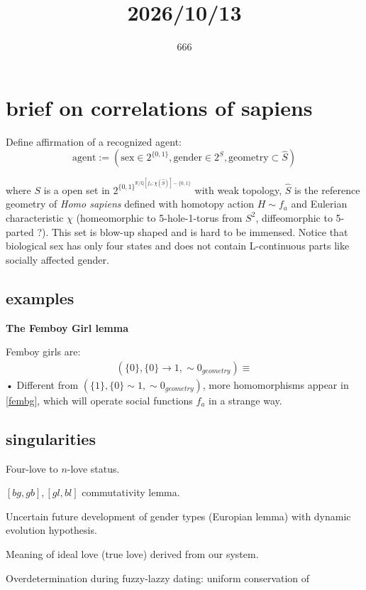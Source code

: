 \documentclass[a4paper]{article}
\title{2026/10/13}
\author{666}
\date{}
\newcommand{\Q}{\mathbb{Q}}
\newcommand{\R}{\mathbb{R}}
\begin{document}
\maketitle
\section{brief on correlations of sapiens}

Define affirmation of a recognized agent:
\[ 
\mathrm{agent} := \left( \text{sex}\in 2^{\{0,1\}}, \text{gender}\in 2^{\mathit{S}}, \text{geometry}\subset \hat{S} \right)
\]

where $\mathit{S} $ is a open set in $2^{{\{0,1\}}^ {\R/ \Q[f_{a}; \chi(\hat{S}) ] - \{0,1\}}}$ with weak topology, $\hat{S}$ is the reference geometry of \textit{Homo sapiens} defined with homotopy action $H \sim f_a $ and Eulerian characteristic $\chi$ (homeomorphic to 5-hole-1-torus from $S^2$,  diffeomorphic to 5-parted ?). This set is blow-up shaped and is hard to be immensed. Notice that biological sex has only four states and does not contain L-continuous parts like socially affected gender.

\subsection{examples}
\noindent \textbf{The Femboy Girl lemma}

Femboy girls are: 
\begin{align}\label{fembg}
\left(  \{0\}, \{0\}\rightarrow {1}, \sim{0}_{geometry } \right) \equiv  
\end{align}•
Different from $(\{1\}, \{0\}\sim{1} , \sim{0}_{geometry} )$, more homomorphisms appear in \ref{fembg}, which will operate social functions $f_a$ in a strange way.


\subsection{singularities}

Four-love to $n$-love status.

$[bg, gb], [gl, bl]$ commutativity lemma.

Uncertain future development of gender types (Europian lemma) with dynamic evolution hypothesis.

Meaning of ideal love (true love) derived from our system.

Overdetermination during fuzzy-lazzy dating: uniform conservation of 
\end{document}
